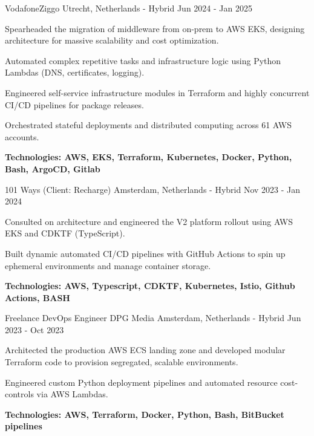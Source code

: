 
\begin{cventries}

{VodafoneZiggo}
{Utrecht, Netherlands - Hybrid}
{Jun 2024 - Jan 2025}
{
	\begin{cvitems}
		\item {Spearheaded the migration of middleware from on-prem to AWS EKS, designing architecture for massive scalability and cost optimization.}
		\item {Automated complex repetitive tasks and infrastructure logic using Python Lambdas (DNS, certificates, logging).}
		\item {Engineered self-service infrastructure modules in Terraform and highly concurrent CI/CD pipelines for package releases.}
		\item {Orchestrated stateful deployments and distributed computing across 61 AWS accounts.}
		\item {\bfseries{Technologies:} AWS, EKS, Terraform, Kubernetes, Docker, Python, Bash, ArgoCD, Gitlab}
	\end{cvitems}
}

{101 Ways (Client: Recharge)}
{Amsterdam, Netherlands - Hybrid}
{Nov 2023 - Jan 2024}
{
	\begin{cvitems}
		\item {Consulted on architecture and engineered the V2 platform rollout using AWS EKS and CDKTF (TypeScript).}
		\item {Built dynamic automated CI/CD pipelines with GitHub Actions to spin up ephemeral environments and manage container storage.}
		\item {\bfseries{Technologies:} AWS, Typescript, CDKTF, Kubernetes, Istio, Github Actions, BASH}
	\end{cvitems}
}

\cventry
{Freelance DevOps Engineer}
{DPG Media}
{Amsterdam, Netherlands - Hybrid}
{Jun 2023 - Oct 2023}
{
	\begin{cvitems}
		\item {Architected the production AWS ECS landing zone and developed modular Terraform code to provision segregated, scalable environments.}
		\item {Engineered custom Python deployment pipelines and automated resource cost-controls via AWS Lambdas.}
		\item {\bfseries{Technologies:} AWS, Terraform, Docker, Python, Bash, BitBucket pipelines}
	\end{cvitems}
}


\end{cventries}
